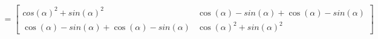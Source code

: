 \documentclass[preview]{standalone}
\begin{document}
\begin{align*}
=\begin{bmatrix} cos(\alpha)^2 + sin(\alpha)^2  & \cos(\alpha)  -sin(\alpha) + \cos(\alpha)  -sin(\alpha) \\ \cos(\alpha)  -sin(\alpha) + \cos(\alpha)  -sin(\alpha) & \cos(\alpha)^2+  sin(\alpha)^2\end{bmatrix}
\end{align*}
\end{document}
